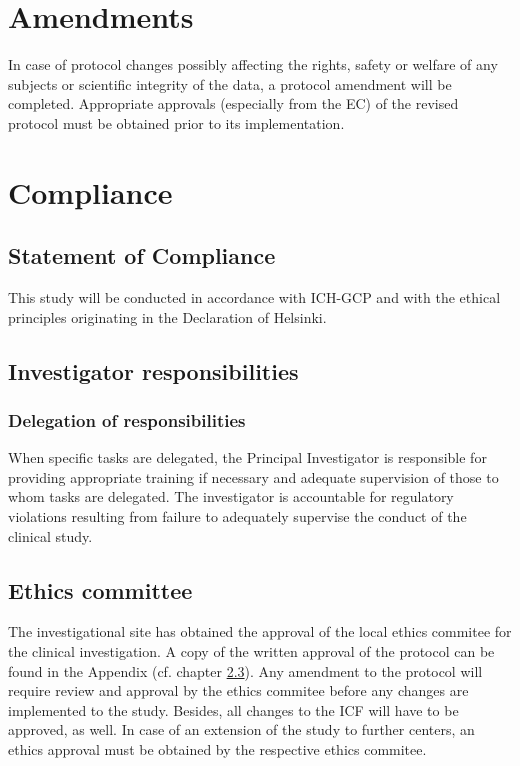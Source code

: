 \section{Amendments}
In case of protocol changes possibly affecting the rights, safety or welfare of any subjects or scientific integrity of the data, a protocol amendment will be completed. Appropriate approvals (especially from the \ac{EC}) of the revised protocol must be obtained prior to its implementation.

\section{Compliance}
\subsection{Statement of Compliance}
This study will be conducted in accordance with ICH-GCP and with the ethical principles originating in the Declaration of Helsinki. 

\subsection{Investigator responsibilities}

\subsubsection{Delegation of responsibilities}
When specific tasks are delegated, the Principal Investigator is responsible for providing appropriate training if necessary and adequate supervision of those to whom tasks are delegated. The investigator is accountable for regulatory violations resulting from failure to adequately supervise the conduct of the clinical study. 

\subsection{Ethics committee}
The investigational site has obtained the approval of the local ethics commitee for the clinical investigation. A copy of the written approval of the protocol can be found in the Appendix (cf. chapter \ref{}). Any amendment to the protocol will require review and approval by the ethics commitee before any changes are implemented to the study. Besides, all changes to the \ac{ICF} will have to be approved, as well. In case of an extension of the study to further centers, an ethics approval must be obtained by the respective ethics commitee. 

